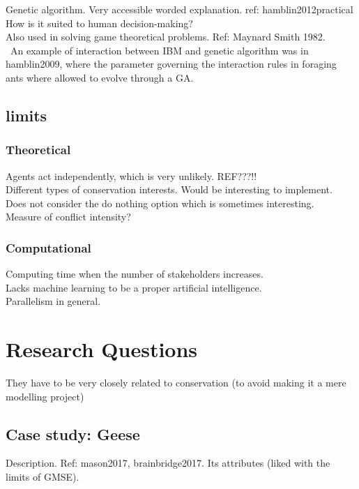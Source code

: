 \documentclass[12pt,a4paper]{article}
\begin{document}
Genetic algorithm. Very accessible worded explanation. ref: hamblin2012practical\\
How is it suited to human decision-making?\\
Also used in solving game theoretical problems. Ref: Maynard Smith 1982.\\\
An example of interaction between IBM and genetic algorithm was in hamblin2009, where the parameter governing the interaction rules in foraging ants where allowed to evolve through a GA. 

\subsection{limits}

\subsubsection{Theoretical}

Agents act independently, which is very unlikely. REF???!!\\
Different types of conservation interests.
Would be interesting to implement.\\
Does not consider the do nothing option which is sometimes interesting.\\
Measure of conflict intensity?

\subsubsection{Computational}
Computing time when the number of stakeholders increases.\\
Lacks machine learning to be a proper artificial intelligence.\\
Parallelism in general.

\section{Research Questions}

They have to be very closely related to conservation (to avoid making it a mere modelling project)

\subsection{Case study: Geese}

Description. Ref: mason2017, brainbridge2017.
Its attributes (liked with the limits of GMSE). 
\end{document}
